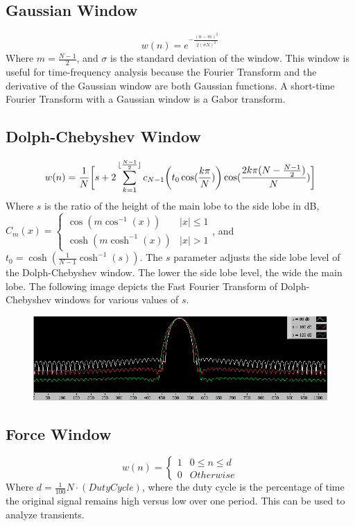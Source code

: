 \documentclass[oneside]{book}
\theoremstyle{mystyle}
\DeclarePairedDelimiter\floor{\lfloor}{\rfloor}
\begin{document}
\subsection{Gaussian Window}
\begin{equation}
w(n) = e^{-\frac{(n-m)^2}{2(\sigma N)^2}}
\end{equation}
\noindent Where $m = \frac{N-1}{2}$, and $\sigma$ is the standard deviation of the window. This window is useful for time-frequency analysis because the Fourier Transform and the derivative of the Gaussian window are both Gaussian functions. A short-time Fourier Transform with a Gaussian window is a Gabor transform.
\subsection{Dolph-Chebyshev Window}
\begin{equation}
w(n) = \frac{1}{N}\bigg[s+2\sum_{k=1}^{\floor{\frac{N-1}{2}}}c_{N-1}\bigg(t_{0}\cos(\frac{k\pi}{N})\bigg)\cos(\frac{2k\pi(N-\frac{N-1}{2})}{N})\bigg]
\end{equation}
\noindent Where $s$ is the ratio of the height of the main lobe to the side lobe in dB, $C_{m}(x) = \begin{cases} \cos(m\cos^{-1}(x)) & |x|\leq 1 \\ \cosh(m\cosh^{-1}(x)) & |x|>1\end{cases}$, and $t_{0} = \cosh(\frac{1}{N-1}\cosh^{-1}(s))$. The $s$ parameter adjusts the side lobe level of the Dolph-Chebyshev window. The lower the side lobe level, the wide the main lobe. The following image depicts the Fast Fourier Transform of Dolph-Chebyshev windows for various values of $s$.
\begin{figure}[htbp]
  \centering
{\includegraphics[scale=0.65]{CDSW_3}}
  \hfill
\end{figure}
\subsection{Force Window}
\begin{equation}
w(n) = \begin{cases} 1 & 0 \leq n \leq d \\ 0 & Otherwise \end{cases}
\end{equation}
\noindent Where $d = \frac{1}{100}N\cdot (Duty Cycle)$, where the duty cycle is the percentage of time the original signal remains high versus low over one period. This can be used to analyze transients.
\end{document}
